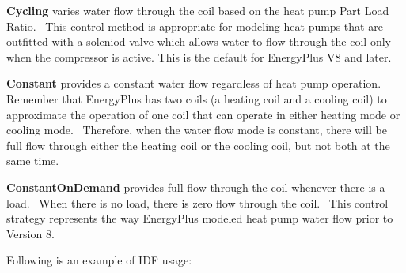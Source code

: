 \textbf{Cycling} varies water flow through the coil based on the heat pump Part Load Ratio.~ This control method is appropriate for modeling heat pumps that are outfitted with a soleniod valve which allows water to flow through the coil only when the compressor is active. This is the default for EnergyPlus V8 and later.

\textbf{Constant} provides a constant water flow regardless of heat pump operation.~ Remember that EnergyPlus has two coils (a heating coil and a cooling coil) to approximate the operation of one coil that can operate in either heating mode or cooling mode.~ Therefore, when the water flow mode is constant, there will be full flow through either the heating coil or the cooling coil, but not both at the same time.

\textbf{ConstantOnDemand} provides full flow through the coil whenever there is a load.~ When there is no load, there is zero flow through the coil.~ This control strategy represents the way EnergyPlus modeled heat pump water flow prior to Version 8.

Following is an example of IDF usage:

